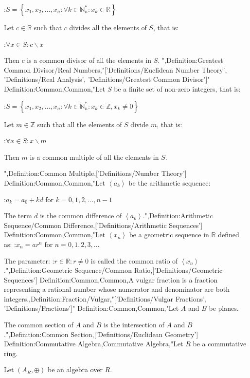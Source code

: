 :$S = \left\lbrace x_1, x_2, \ldots, x_n: \forall k \in \mathbb N^*_n: x_k \in \mathbb R \right\rbrace$


Let $c \in \mathbb R$ such that $c$ divides all the elements of $S$, that is:

:$\forall x \in S: c \mathrel \backslash x$


Then $c$ is a common divisor of all the elements in $S$.
",Definition:Greatest Common Divisor/Real Numbers,"['Definitions/Euclidean Number Theory', 'Definitions/Real Analysis', 'Definitions/Greatest Common Divisor']"
Definition:Common,Common,"Let $S$ be a finite set of non-zero integers, that is:

:$S = \left\lbrace x_1, x_2, \ldots, x_n: \forall k \in \mathbb N^*_n: x_k \in \mathbb Z, x_k \ne 0 \right\rbrace$


Let $m \in \mathbb Z$ such that all the elements of $S$ divide $m$, that is:

:$\forall x \in S: x \mathrel \backslash m$


Then $m$ is a common multiple of all the elements in $S$.

",Definition:Common Multiple,['Definitions/Number Theory']
Definition:Common,Common,"Let $\left\langle a_k \right\rangle$ be the arithmetic sequence:

:$a_k = a_0 + k d$ for $k = 0, 1, 2, \ldots, n - 1$


The term $d$ is the common difference of $\left\langle a_k \right\rangle$.",Definition:Arithmetic Sequence/Common Difference,['Definitions/Arithmetic Sequences']
Definition:Common,Common,"Let $\left\langle x_n \right\rangle$ be a geometric sequence in $\mathbb R$ defined as:
:$x_n = a r^n$ for $n = 0, 1, 2, 3, \ldots$


The parameter:
:$r \in \mathbb R: r \ne 0$
is called the common ratio of $\left\langle x_n \right\rangle$.",Definition:Geometric Sequence/Common Ratio,['Definitions/Geometric Sequences']
Definition:Common,Common,A vulgar fraction is a fraction representing a rational number whose numerator and denominator are both integers.,Definition:Fraction/Vulgar,"['Definitions/Vulgar Fractions', 'Definitions/Fractions']"
Definition:Common,Common,"Let $A$ and $B$ be planes.

The common section of $A$ and $B$ is the intersection of $A$ and $B$.",Definition:Common Section,['Definitions/Euclidean Geometry']
Definition:Commutative Algebra,Commutative Algebra,"Let $R$ be a commutative ring.

Let $\left( A_R, \oplus \right)$ be an algebra over $R$.


